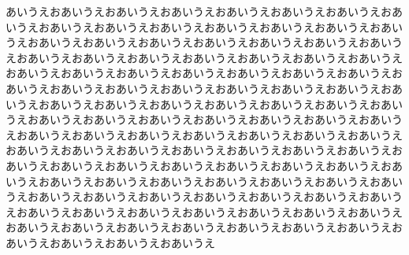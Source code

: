 \documentclass[luatex,fontsize=8pt,paper=b5,twoside,report,tate]{jlreq}%
\begin{document}
\reversemarginpar
あいうえおあいうえおあいうえおあいうえおあいうえおあいうえおあいうえおあいうえおあいうえおあいうえおあいうえおあいうえおあいうえおあいうえおあいうえおあいうえおあいうえおあいうえおあいうえおあいうえおあいうえおあいうえおあいうえおあいうえおあいうえおあいうえおあいうえおあいうえおあいうえおあいうえおあいうえおあいうえおあいうえおあいうえおあいうえおあいうえおあいうえおあいうえおあいうえおあいうえおあいうえおあいうえおあいうえおあいうえおあいうえおあいうえおあいうえおあいうえおあいうえおあいうえおあいうえおあいうえおあいうえおあいうえおあいうえおあいうえおあいうえおあいうえおあいうえおあいうえおあいうえおあいうえおあいうえおあいうえおあいうえおあいうえおあいうえおあいうえおあいうえおあいうえおあいうえおあいうえおあいうえおあいうえおあいうえおあいうえおあいうえおあいうえおあいうえおあいうえおあいうえおあいうえおあいうえおあいうえおあいうえおあいうえおあいうえおあいうえおあいうえおあいうえおあいうえおあいうえおあいうえおあいうえおあいうえおあいうえおあいうえおあいうえおあいうえおあいうえおあいうえおあいうえおあいうえおあいうえおあいうえおあいうえおあいうえおあいうえおあいうえおあいうえおあいうえおあいうえ\newpage 
\end{document}
